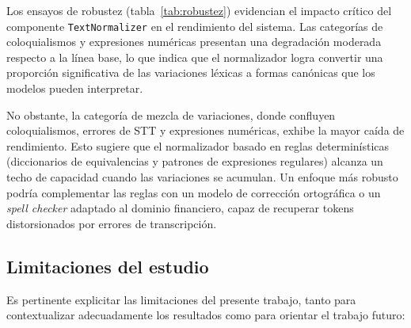 Los ensayos de robustez (tabla~\ref{tab:robustez}) evidencian el impacto crítico del componente \texttt{TextNormalizer} en el rendimiento del sistema.
Las categorías de coloquialismos y expresiones numéricas presentan una degradación moderada respecto a la línea base, lo que indica que el normalizador logra convertir una proporción significativa de las variaciones léxicas a formas canónicas que los modelos pueden interpretar.

No obstante, la categoría de mezcla de variaciones, donde confluyen coloquialismos, errores de STT y expresiones numéricas, exhibe la mayor
caída de rendimiento. Esto sugiere que el normalizador basado en reglas determinísticas (diccionarios de equivalencias y patrones de expresiones
regulares) alcanza un techo de capacidad cuando las variaciones se acumulan. Un enfoque más robusto podría complementar las reglas con un modelo de corrección ortográfica o un \textit{spell checker} adaptado al dominio financiero, capaz de recuperar tokens distorsionados por errores de
transcripción.

\subsection{Limitaciones del estudio}
\label{subsec:limitaciones}

Es pertinente explicitar las limitaciones del presente trabajo, tanto para contextualizar adecuadamente los resultados como para orientar el trabajo
futuro:

